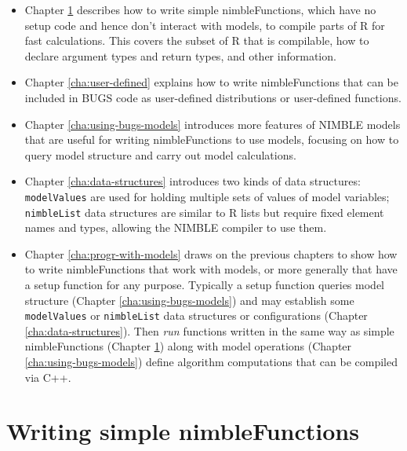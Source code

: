 \documentclass[12pt,oneside]{book}\usepackage[]{graphicx}\usepackage[]{color}
\def\cd#1{\texttt{#1}}
\def\nm#1{\textit{#1}}
\begin{document}
\begin{itemize}
\item Chapter \ref{cha:RCfunctions} describes how to write simple nimbleFunctions, which have no setup code and hence don't interact with models, to compile parts of R for fast calculations. This covers the subset of R that is compilable, how to declare argument types and return types, and other information.

\item Chapter \ref{cha:user-defined} explains how to write nimbleFunctions that can be included in BUGS code as user-defined distributions or user-defined functions.

\item Chapter \ref{cha:using-bugs-models} introduces more features of NIMBLE models that are useful for writing nimbleFunctions to use models, focusing on how to query model structure and carry out model calculations.  

\item Chapter \ref{cha:data-structures} introduces two kinds of data structures: \cd{modelValues} are used for holding multiple sets of values of model variables; \cd{nimbleList} data structures are similar to R lists but require fixed element names and types, allowing the NIMBLE compiler to use them. 

\item Chapter \ref{cha:progr-with-models} draws on the previous chapters to show how to write nimbleFunctions that work with models, or more generally that have a setup function for any purpose.  Typically a setup function queries model structure (Chapter \ref{cha:using-bugs-models}) and may establish some \cd{modelValues} or \cd{nimbleList} data structures or configurations (Chapter \ref{cha:data-structures}).  Then \nm{run} functions written in the same way as simple nimbleFunctions (Chapter \ref{cha:RCfunctions}) along with model operations (Chapter \ref{cha:using-bugs-models}) define algorithm computations that can be compiled via C++.

\end{itemize}










\chapter{Writing simple nimbleFunctions}
\label{cha:RCfunctions}
\end{document}
